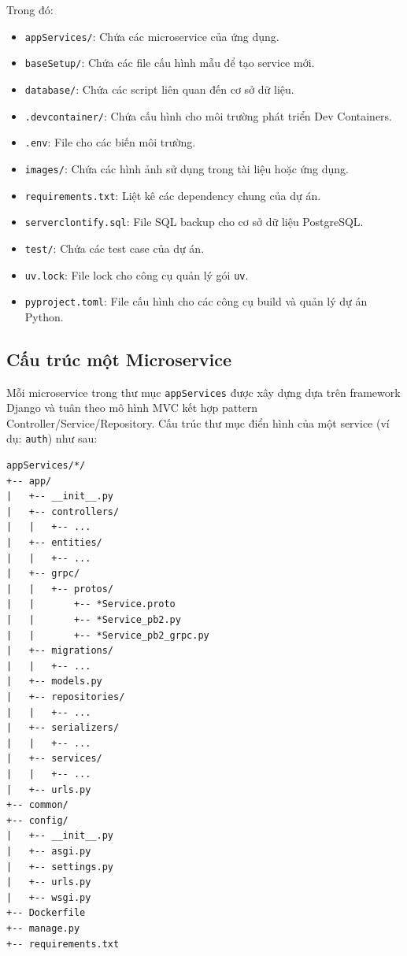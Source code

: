 Trong đó:
\begin{itemize}
    \item \texttt{appServices/}: Chứa các microservice của ứng dụng.
    \item \texttt{baseSetup/}: Chứa các file cấu hình mẫu để tạo service mới.
    \item \texttt{database/}: Chứa các script liên quan đến cơ sở dữ liệu.
    \item \texttt{.devcontainer/}: Chứa cấu hình cho môi trường phát triển Dev Containers.
    \item \texttt{.env}: File cho các biến môi trường.
    \item \texttt{images/}: Chứa các hình ảnh sử dụng trong tài liệu hoặc ứng dụng.
    \item \texttt{requirements.txt}: Liệt kê các dependency chung của dự án.
    \item \texttt{serverclontify.sql}: File SQL backup cho cơ sở dữ liệu PostgreSQL.
    \item \texttt{test/}: Chứa các test case của dự án.
    \item \texttt{uv.lock}: File lock cho công cụ quản lý gói \texttt{uv}.
    \item \texttt{pyproject.toml}: File cấu hình cho các công cụ build và quản lý dự án Python.
\end{itemize}

\subsection{Cấu trúc một Microservice}
\label{subsec:microservice_structure}

Mỗi microservice trong thư mục \texttt{appServices} được xây dựng dựa trên framework Django và tuân theo mô hình MVC kết hợp pattern Controller/Service/Repository. Cấu trúc thư mục điển hình của một service (ví dụ: \texttt{auth}) như sau:

\begin{verbatim}
appServices/*/
+-- app/
|   +-- __init__.py
|   +-- controllers/
|   |   +-- ...
|   +-- entities/
|   |   +-- ...
|   +-- grpc/
|   |   +-- protos/
|   |       +-- *Service.proto
|   |       +-- *Service_pb2.py
|   |       +-- *Service_pb2_grpc.py
|   +-- migrations/
|   |   +-- ...
|   +-- models.py
|   +-- repositories/
|   |   +-- ...
|   +-- serializers/
|   |   +-- ...
|   +-- services/
|   |   +-- ...
|   +-- urls.py
+-- common/
+-- config/
|   +-- __init__.py
|   +-- asgi.py
|   +-- settings.py
|   +-- urls.py
|   +-- wsgi.py
+-- Dockerfile
+-- manage.py
+-- requirements.txt
\end{verbatim}

